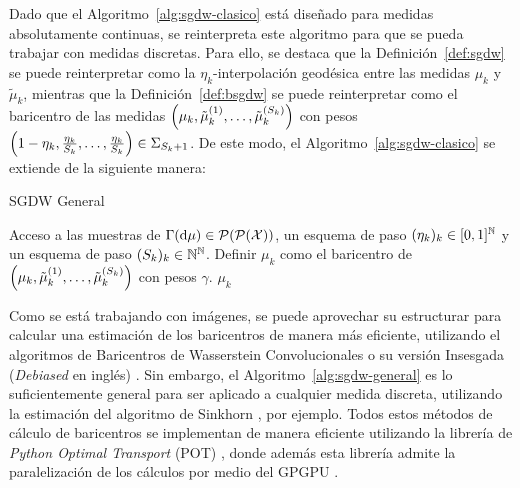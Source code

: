 Dado que el Algoritmo~\ref{alg:sgdw-clasico} está diseñado para medidas absolutamente continuas, se reinterpreta este algoritmo para que se pueda trabajar con medidas discretas. Para ello, se destaca que la Definición~\ref{def:sgdw} se puede reinterpretar como la $\eta_k$-interpolación geodésica entre las medidas $\mu_k$ y $\tilde \mu_k$, mientras que la Definición~\ref{def:bsgdw} se puede reinterpretar como el baricentro de las medidas $\qty( \mu_k, \tilde\mu_k^{(1)}, \dots, \tilde\mu_k^{(S_k)} )$ con pesos $\qty(1-\eta_k, \frac{\eta_k}{S_k}, \dots, \frac{\eta_k}{S_k}) \in \Simplex[S_k+1]$. De este modo, el Algoritmo~\ref{alg:sgdw-clasico} se extiende de la siguiente manera:
\begin{algorithm}[H]
    \caption{SGDW General}
    \label{alg:sgdw-general}
    \begin{algorithmic}[1]
        \Require Acceso a las muestras de $\Gamma(\dd \mu) \in \ProbSpace[\ProbSpace]$, un esquema de paso $(\eta_k)_k \in [0, 1]^\N$ y un esquema de paso $(S_k)_k \in \N^\N$.
        \Repeat
        \State Definir $\mu_k$ como el baricentro de $\qty( \mu_k, \tilde\mu_k^{(1)}, \dots, \tilde\mu_k^{(S_k)} )$ con pesos $\gamma$.
        \State\Return $\mu_k$
    \end{algorithmic}
\end{algorithm}

Como se está trabajando con imágenes, se puede aprovechar su estructurar para calcular una estimación de los baricentros de manera más eficiente, utilizando el algoritmos de Baricentros de Wasserstein Convolucionales \cite{solomon2015convolutional} o su versión Insesgada (\textit{Debiased} en inglés) \cite{janati2020debiased}. Sin embargo, el Algoritmo~\ref{alg:sgdw-general} es lo suficientemente general para ser aplicado a cualquier medida discreta, utilizando la estimación del algoritmo de Sinkhorn \cite{cuturi2013sinkhorn}, por ejemplo. Todos estos métodos de cálculo de baricentros se implementan de manera eficiente utilizando la librería de \textit{Python Optimal Transport} (POT) \cite{flamary2021pot}, donde además esta librería admite la paralelización de los cálculos por medio del GPGPU \cite{owens2008gpu}.


